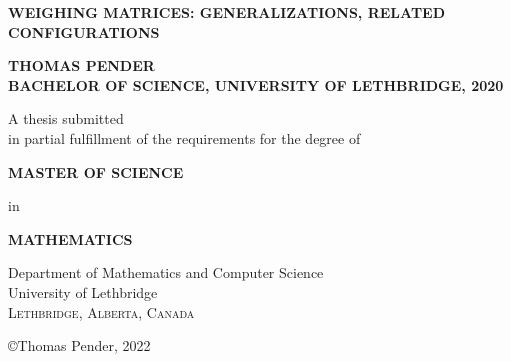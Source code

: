 \documentclass[../main]{subfiles}
\begin{document}
\begin{center}

\thispagestyle{empty}

\begin{large}
\MakeUppercase{\bf Weighing Matrices: Generalizations, related configurations}
\end{large}

\vspace{1.25in}

\begin{large}
 \MakeUppercase{\bf Thomas Pender\\Bachelor of Science, University of Lethbridge, 2020} 
\end{large}

\vspace{1.25in}

A thesis submitted\\in partial fulfillment of the requirements for the degree of

\vspace{0.25in}

\begin{large}
 \MakeUppercase{\bf Master of Science}
\end{large}

\vspace{0.25in}

in

\vspace{0.25in}

\begin{large}
 \MakeUppercase{\bf Mathematics} 
\end{large}

\vspace{1.25in}

Department of Mathematics and Computer Science\\University of Lethbridge\\\textsc{Lethbridge, Alberta, Canada}

\vspace{1in}

\copyright Thomas Pender, 2022

\end{center}

\newpage
\blankpage
\end{document}
